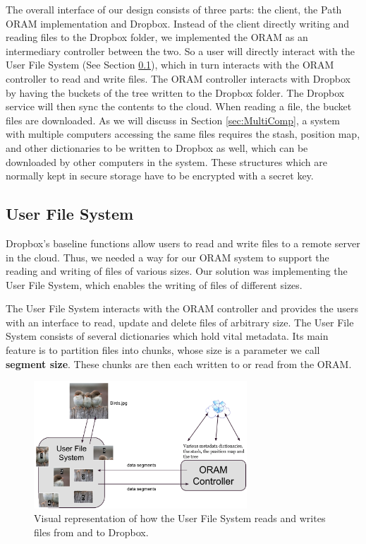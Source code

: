 \documentclass[conference]{IEEEtran}
\begin{document}
The overall interface of our design consists of three parts: the client, the Path ORAM implementation and Dropbox. Instead of the client directly writing and reading files to the Dropbox folder, we implemented the ORAM as an intermediary controller between the two. So a user will directly interact with the User File System (See Section \ref{sec:UFS}), which in turn interacts with the ORAM controller to read and write files. The ORAM controller interacts with Dropbox by having the buckets of the tree written to the Dropbox folder. The Dropbox service will then sync the contents to the cloud. When reading a file, the bucket files are downloaded. As we will discuss in Section \ref{sec:MultiComp}, a system with multiple computers accessing the same files requires the stash, position map, and other dictionaries to be written to Dropbox as well, which can be downloaded by other computers in the system. These structures which are normally kept in secure storage have to be encrypted with a secret key.

\subsection{User File System}

\label{sec:UFS}
Dropbox's baseline functions allow users to read and write files to a remote server in the cloud. Thus, we needed a way for our ORAM system to support the reading and writing of files of various sizes. Our solution was implementing the User File System, which enables the writing of files of different sizes. 

The User File System interacts with the ORAM controller and provides the users with an interface to read, update and delete files of arbitrary size. The User File System consists of several dictionaries which hold vital metadata. Its main feature is to partition files into chunks, whose size is a parameter we call {\bf segment size}. These chunks are then each written to or read from the ORAM.

\begin{figure}
\begin{center}
\noindent\includegraphics[width=8cm]{320.pdf}
\caption{Visual representation of how the User File System reads and writes files from and to Dropbox.}
\label{fig:userfilesys}
\end{center}
\end{figure}
\end{document}
